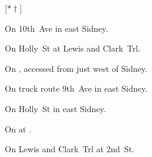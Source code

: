 
[$\ast\dagger$]

\begin{LocationList}

On 10th~Ave in east Sidney.

On Holly~St at   Lewis and Clark~Trl.

On , accessed from  just west of Sidney.

On truck route  9th~Ave in east Sidney.

On  Holly~St in east Sidney.

\Location{\TruckStop \Gas \Rest \Service}
On   at .

On   Lewis and Clark~Trl at 2nd~St.

\end{LocationList}
